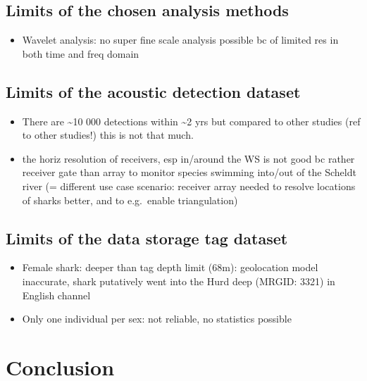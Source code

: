 \documentclass[
  authoryear,
  review,
  3p]{elsarticle}
\providecommand{\tightlist}{%
  \setlength{\itemsep}{0pt}\setlength{\parskip}{0pt}}\usepackage{longtable,booktabs,array}
\begin{document}
\hypertarget{limits-of-the-chosen-analysis-methods}{%
\subsection{Limits of the chosen analysis
methods}\label{limits-of-the-chosen-analysis-methods}}

\begin{itemize}
\tightlist
\item
  Wavelet analysis: no super fine scale analysis possible bc of limited
  res in both time and freq domain
\end{itemize}

\hypertarget{sec-disclimitsacoustic}{%
\subsection{Limits of the acoustic detection
dataset}\label{sec-disclimitsacoustic}}

\begin{itemize}
\tightlist
\item
  There are \textasciitilde10 000 detections within \textasciitilde2 yrs
  but compared to other studies (ref to other studies!) this is not that
  much.
\item
  the horiz resolution of receivers, esp in/around the WS is not good bc
  rather receiver gate than array to monitor species swimming into/out
  of the Scheldt river (= different use case scenario: receiver array
  needed to resolve locations of sharks better, and to e.g.~enable
  triangulation)
\end{itemize}

\hypertarget{limits-of-the-data-storage-tag-dataset}{%
\subsection{Limits of the data storage tag
dataset}\label{limits-of-the-data-storage-tag-dataset}}

\begin{itemize}
\tightlist
\item
  Female shark: deeper than tag depth limit (68m): geolocation model
  inaccurate, shark putatively went into the Hurd deep (MRGID: 3321) in
  English channel
\item
  Only one individual per sex: not reliable, no statistics possible
\end{itemize}

\hypertarget{conclusion}{%
\section{Conclusion}\label{conclusion}}
\end{document}
